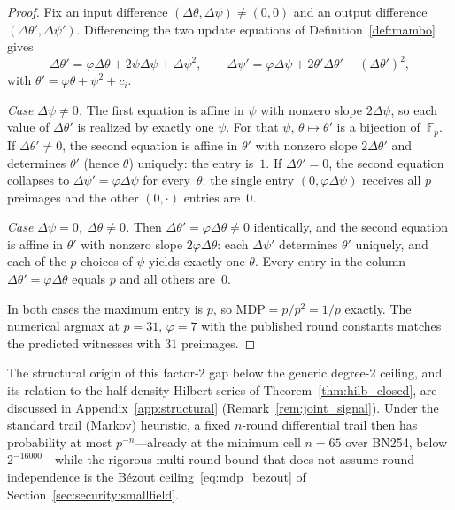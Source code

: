 \documentclass[11pt,a4paper]{article}
\theoremstyle{definition}
\newcommand{\Fp}{\mathbb{F}_p}
\begin{document}
\begin{proof}
Fix an input difference $(\Delta\theta, \Delta\psi) \ne (0,0)$ and an
output difference $(\Delta\theta', \Delta\psi')$. Differencing the
two update equations of Definition~\ref{def:mambo} gives
\[
  \Delta\theta' = \varphi\Delta\theta + 2\psi\Delta\psi +
  \Delta\psi^2,
  \qquad
  \Delta\psi' = \varphi\Delta\psi + 2\theta'\Delta\theta' +
  (\Delta\theta')^2,
\]
with $\theta' = \varphi\theta + \psi^2 + c_i$.

\emph{Case $\Delta\psi \ne 0$.} The first equation is affine in
$\psi$ with nonzero slope $2\Delta\psi$, so each value of
$\Delta\theta'$ is realized by exactly one $\psi$. For that $\psi$,
$\theta \mapsto \theta'$ is a bijection of~$\Fp$. If
$\Delta\theta' \ne 0$, the second equation is affine in $\theta'$
with nonzero slope $2\Delta\theta'$ and determines $\theta'$ (hence
$\theta$) uniquely: the entry is~$1$. If $\Delta\theta' = 0$, the
second equation collapses to $\Delta\psi' = \varphi\Delta\psi$ for
every~$\theta$: the single entry $(0, \varphi\Delta\psi)$ receives
all $p$ preimages and the other $(0, \cdot)$ entries are~$0$.

\emph{Case $\Delta\psi = 0$, $\Delta\theta \ne 0$.} Then
$\Delta\theta' = \varphi\Delta\theta \ne 0$ identically, and the
second equation is affine in $\theta'$ with nonzero slope
$2\varphi\Delta\theta$: each $\Delta\psi'$ determines $\theta'$
uniquely, and each of the $p$ choices of $\psi$ yields exactly one
$\theta$. Every entry in the column $\Delta\theta' =
\varphi\Delta\theta$ equals $p$ and all others are~$0$.

In both cases the maximum entry is $p$, so $\mathrm{MDP} = p/p^2 =
1/p$ exactly. The numerical argmax at $p = 31$, $\varphi = 7$ with
the published round constants matches the predicted witnesses with
$31$ preimages.
\end{proof}

The structural origin of this factor-2 gap below the generic
degree-2 ceiling, and its relation to the half-density Hilbert
series of Theorem~\ref{thm:hilb_closed}, are discussed in
Appendix~\ref{app:structural} (Remark~\ref{rem:joint_signal}).
Under the standard trail (Markov) heuristic, a fixed $n$-round
differential trail then has probability at most $p^{-n}$---already at
the minimum cell $n = 65$ over BN254, below $2^{-16000}$---while the rigorous
multi-round bound that does not assume round independence is the
B\'ezout ceiling~\eqref{eq:mdp_bezout} of
Section~\ref{sec:security:smallfield}.
\end{document}
